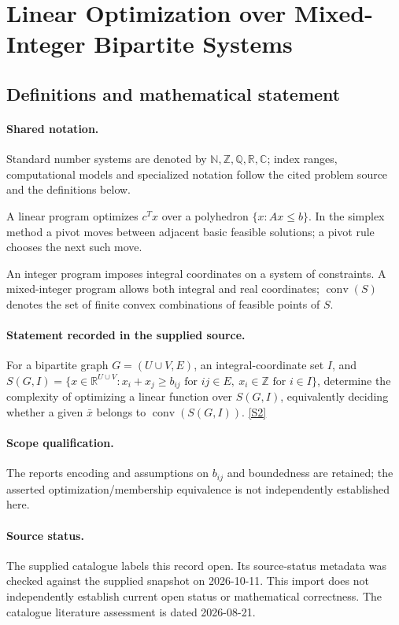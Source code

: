 \documentclass[11pt]{article}
\newcommand{\sref}[2]{\hyperlink{source:#1:#2}{[S#2]}}
\begin{document}
\section{Linear Optimization over Mixed-Integer Bipartite Systems}\label{statement}

\subsection{Definitions and mathematical statement}

\paragraph{Shared notation.}Standard number systems are denoted by $\mathbb N,\mathbb Z,\mathbb Q,\mathbb R,\mathbb C$; index ranges, computational models and specialized notation follow the cited problem source and the definitions below.


A linear program optimizes $c^Tx$ over a polyhedron $\{x:Ax\leq b\}$. In the simplex method a pivot moves between adjacent basic feasible solutions; a pivot rule chooses the next such move.

An integer program imposes integral coordinates on a system of constraints. A mixed-integer program allows both integral and real coordinates; $\operatorname{conv}(S)$ denotes the set of finite convex combinations of feasible points of $S$.
\paragraph{Statement recorded in the supplied source.}
For a bipartite graph $G=(U\cup V,E)$, an integral-coordinate set $I$, and $S(G,I)=\{x\in\mathbb{R}^{U\cup V}:x_i+x_j\geq b_{ij}\text{ for }ij\in E,\ x_i\in\mathbb{Z}\text{ for }i\in I\}$, determine the complexity of optimizing a linear function over $S(G,I)$, equivalently deciding whether a given $\bar{x}$ belongs to $\operatorname{conv}(S(G,I))$. \sref{statement}{2}
\paragraph{Scope qualification.}
The report\textquotesingle s encoding and assumptions on $b_{ij}$ and boundedness are retained; the asserted optimization/membership equivalence is not independently established here.
\paragraph{Source status.}
The supplied catalogue labels this record open. Its source-status metadata was checked against the supplied snapshot on 2026-10-11. This import does not independently establish current open status or mathematical correctness. The catalogue literature assessment is dated 2026-08-21.
\end{document}
